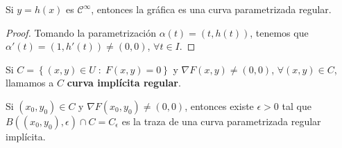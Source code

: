\begin{lema}
Si $\displaystyle y = h\left(x\right) $ es $\displaystyle \mathcal{C}^{\infty} $, entonces la gráfica es una curva parametrizada regular. 
\end{lema}
\begin{proof}
Tomando la parametrización $\displaystyle \alpha\left(t\right)=\left(t, h\left(t\right)\right) $, tenemos que $\displaystyle \alpha'\left(t\right)=\left(1, h'\left(t\right)\right)\neq \left(0,0\right) $, $\displaystyle \forall t \in I $.
\end{proof}
\begin{definition}
	Si $\displaystyle C = \left\{ \left(x,y\right)\in U \; : \; F\left(x,y\right)=0\right\}  $ y $\displaystyle \nabla F\left(x,y\right)\neq \left(0,0\right) $, $\displaystyle \forall \left(x,y\right)\in C $, llamamos a $\displaystyle C $ \textbf{curva implícita regular}.
\end{definition}
\begin{theorem}
Si $\displaystyle \left(x_{0}, y_{0}\right)\in C $ y $\displaystyle \nabla F\left(x_{0}, y_{0}\right)\neq \left(0,0\right)$, entonces existe $\displaystyle \epsilon > 0 $ tal que $\displaystyle B\left(\left(x_{0}, y_{0}\right), \epsilon \right)\cap C= C_{\epsilon} $ es la traza de una curva parametrizada regular implícita.
\end{theorem}
